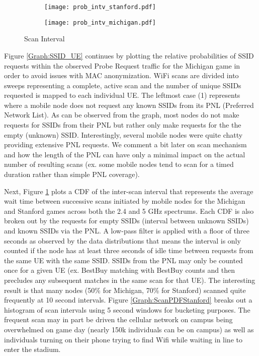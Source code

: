 \documentclass[conference]{IEEEtran}
\begin{document}
\begin{figure}

\centering

\begin{subfigure}[b]{\textwidth}

\texttt{[image: prob\_intv\_stanford.pdf]}

\end{subfigure}

\begin{subfigure}[b]{\textwidth}

\texttt{[image: prob\_intv\_michigan.pdf]}

\end{subfigure}

\caption{Scan Interval}

\label{Graph:ScanInterval}

\end{figure}


Figure \ref{Graph:SSID_UE} continues by plotting the relative probabilities of SSID requests within the observed Probe Request traffic for the Michigan game in order to avoid issues with MAC anonymization.  WiFi scans are divided into sweeps representing a complete, active scan and the number of unique SSIDs requested is mapped to each individual UE.  The leftmost case (1) represents where a mobile node does not request any known SSIDs from its PNL (Preferred Network List).  As can be observed from the graph, most nodes do not make requests for SSIDs from their PNL but rather only make requests for the the empty (unknown) SSID.  Interestingly, several mobile nodes were quite chatty providing extensive PNL requests.  We comment a bit later on scan mechanism and how the length of the PNL can have only a minimal impact on the actual number of resulting scans (ex. some mobile nodes tend to scan for a timed duration rather than simple PNL coverage).         



Next, Figure \ref{Graph:ScanInterval} plots a CDF of the inter-scan interval that represents the average wait time between successive scans initiated by mobile nodes for the Michigan and Stanford games across both the 2.4 and 5 GHz spectrums.  Each CDF is also broken out by the requests for empty SSIDs (interval between unknown SSIDs) and known SSIDs via the PNL.  A low-pass filter is applied with a floor of three seconds as observed by the data distributions that means the interval is only counted if the node has at least three seconds of idle time between requests from the same UE with the same SSID.  SSIDs from the PNL may only be counted once for a given UE (ex. BestBuy matching with BestBuy counts and then precludes any subsequent matches in the same scan for that UE).  The interesting result is that many nodes (50\% for Michigan, 70\% for Stanford) scanned quite frequently at 10 second intervals.  Figure \ref{Graph:ScanPDFStanford} breaks out a histogram of scan intervals using 5 second windows for bucketing purposes.  The frequent scan may in part be driven the cellular network on campus being overwhelmed on game day (nearly 150k individuals can be on campus) as well as individuals turning on their phone trying to find Wifi while waiting in line to enter the stadium.      
\end{document}
